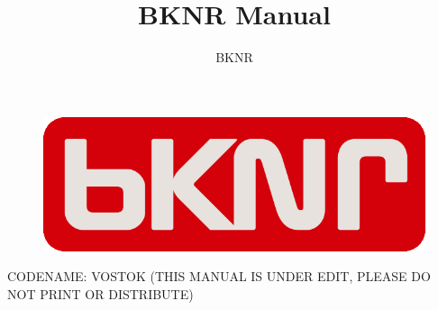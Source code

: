 \documentclass[a4paper,11pt,titlepage]{book}
\title{BKNR Manual}
\author{BKNR}
\begin{document}
\begin{titlepage}
\begin{center}

  \vspace*{6cm}
  \begin{figure}[htbp]
    \centering
    \includegraphics[scale=0.6]{bknrlogo}
  \end{figure}
  \vspace{2cm}
  \Large
  CODENAME: VOSTOK
  (THIS MANUAL IS UNDER EDIT, PLEASE DO NOT PRINT OR DISTRIBUTE)

\end{center}
\end{titlepage}

\tableofcontents






%
%
%
\end{document}
